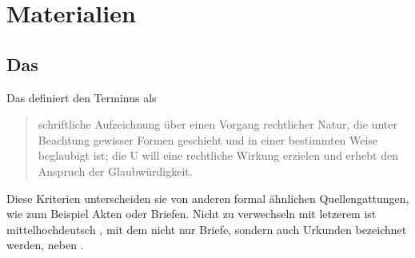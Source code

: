 \chapter{Materialien}
\label{ch:materialien}

\section%
	{Das }
\label{sec:materialcao}

Das  definiert den Terminus
 als \blockcquote[574]{frenz1998a}{schriftliche Aufzeichnung über
einen Vorgang rechtlicher Natur, die unter Beachtung gewisser Formen geschieht
und in einer bestimmten Weise beglaubigt ist; die U will eine
rechtliche Wirkung erzielen und erhebt den Anspruch der Glaubwürdigkeit.}

Diese Kriterien unterscheiden sie von anderen formal ähnlichen
Quellengattungen, wie zum Beispiel Akten oder Briefen. Nicht zu verwechseln mit
letzerem ist mittelhochdeutsch , mit dem
nicht nur Briefe, sondern auch Urkunden bezeichnet werden, neben
\autocites[][s.\,v.~]{mwb1}[][s.\,v.~]{mwb2}[vgl.
auch][]{schmidtwiegand1998a}.

